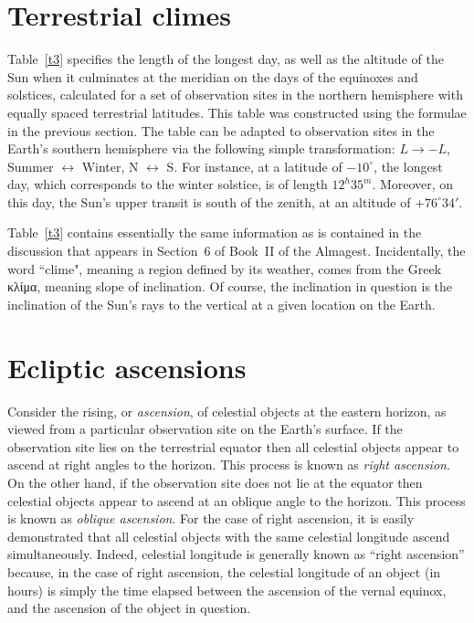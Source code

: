 \section{Terrestrial climes}
Table~\ref{t3} specifies the length of the longest day, as well as the altitude of the
Sun when it culminates at the meridian on the days of the equinoxes and solstices, calculated for a set of observation sites in the northern hemisphere with equally
spaced terrestrial latitudes. This table was constructed
using the formulae in the previous section.  The table can be adapted to observation sites in the Earth's
southern hemisphere via the following simple transformation: $L\rightarrow -L$, Summer $\leftrightarrow$ Winter, N $\leftrightarrow$ S. For instance, at a latitude of $-10^\circ$, the longest day, which corresponds
to the winter solstice, is of length $12^h35^m$. Moreover, on this day, the Sun's upper transit
is  south  of the zenith, at an altitude of $+76^\circ 34'$. 

Table~\ref{t3} contains essentially the same information as is contained in the discussion that appears in Section~6 of Book~II of the Almagest. 
Incidentally, the word  ``clime", meaning a region defined by its weather, comes from the Greek κλίμα, meaning slope of inclination. Of course, the inclination in question is
the inclination of the Sun's rays to the vertical at a given location on the Earth. 

\section{Ecliptic ascensions}
Consider the rising, or {\em ascension}, of celestial objects at the eastern
horizon, as viewed from a particular observation site on the Earth's
surface. If the observation site lies on the terrestrial equator then all
celestial objects appear to ascend at right angles to the horizon. This process is
known as {\em right ascension}. On the other hand, if the
observation site does not lie at the equator then celestial objects
appear to ascend at an oblique angle to the horizon. This process is known
as {\em oblique ascension}. For the case of right ascension, it is
easily demonstrated that all celestial objects with the same celestial
longitude ascend simultaneously. Indeed, celestial longitude is generally
known as ``right ascension'' because, in the case of right ascension, the
celestial longitude of an object (in hours) is simply the time elapsed between the ascension of the vernal equinox, and the ascension of the object
in question.

